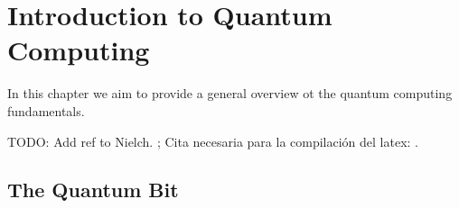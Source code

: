 
\chapter{Introduction to Quantum Computing}

In this chapter we aim to provide a general overview ot the quantum computing fundamentals.

TODO: Add ref to Nielch. ; Cita necesaria para la compilación del latex: 
\cite{Smith1981}.

\section{The Quantum Bit}

